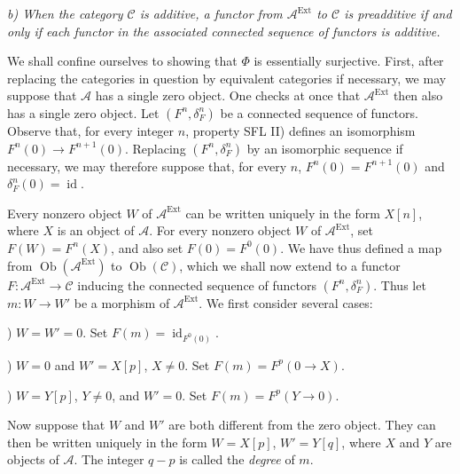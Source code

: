 \clearpage
{}%
\begingroup\small\setlength{\parskip}{0pt}\setlength{\emergencystretch}{1.5em}
\setlength{\abovedisplayskip}{4pt plus 2pt minus 2pt}%
\setlength{\belowdisplayskip}{4pt plus 2pt minus 2pt}%

\noindent\textit{b) When the category $\mathcal C$ is additive, a functor
from $\mathcal A^{\operatorname{Ext}}$ to $\mathcal C$ is preadditive if
and only if each functor in the associated connected sequence of functors
is additive.}

We shall confine ourselves to showing that $\Phi$ is essentially
surjective. First, after replacing the categories in question by equivalent
categories if necessary, we may suppose that $\mathcal A$ has a single
zero object. One checks at once that
$\mathcal A^{\operatorname{Ext}}$ then also has a single zero object. Let
$(F^n,\delta_F^n)$ be a connected sequence of functors. Observe that, for
every integer $n$, property SFL II) defines an isomorphism
$F^n(0)\longrightarrow F^{n+1}(0)$. Replacing $(F^n,\delta_F^n)$ by an
isomorphic sequence if necessary, we may therefore suppose that, for every
$n$, $F^n(0)=F^{n+1}(0)$ and $\delta_F^n(0)=\operatorname{id}$.

Every nonzero object $W$ of $\mathcal A^{\operatorname{Ext}}$ can be
written uniquely in the form $X[n]$, where $X$ is an object of
$\mathcal A$. For every nonzero object $W$ of
$\mathcal A^{\operatorname{Ext}}$, set $F(W)=F^n(X)$, and also set
$F(0)=F^0(0)$. We have thus defined a map from
$\operatorname{Ob}(\mathcal A^{\operatorname{Ext}})$ to
$\operatorname{Ob}(\mathcal C)$, which we shall now extend to a functor
$F\colon\mathcal A^{\operatorname{Ext}}\longrightarrow\mathcal C$ inducing
the connected sequence of functors $(F^n,\delta_F^n)$. Thus let
$m\colon W\longrightarrow W'$ be a morphism of
$\mathcal A^{\operatorname{Ext}}$. We first consider several cases:

) $W=W'=0$. Set $F(m)=\operatorname{id}_{F^0(0)}$.

) $W=0$ and $W'=X[p]$, $X\neq0$. Set
$F(m)=F^p(0\longrightarrow X)$.

) $W=Y[p]$, $Y\neq0$, and $W'=0$. Set
$F(m)=F^p(Y\longrightarrow0)$.

Now suppose that $W$ and $W'$ are both different from the zero object.
They can then be written uniquely in the form $W=X[p]$, $W'=Y[q]$, where
$X$ and $Y$ are objects of $\mathcal A$. The integer $q-p$ is called the
\emph{degree} of $m$.

